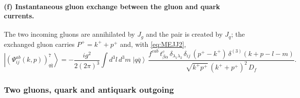 \documentclass[11pt,a4paper]{article}
\numberwithin{equation}{section}
\newcommand{\ibar}[2]{\draw[line width=1.1pt] (#1-0.13,#2) -- (#1+0.13,#2);}
\newcommand{\dthree}{\delta^{(3)}}
\newcommand{\ket}[1]{\left|#1\right\rangle}
\newcommand{\qk}[3]{q^{#1}_{#2}(#3)}
\newcommand{\aqk}[3]{\bar q^{#1}_{#2}(#3)}
\newcommand{\gl}[3]{g^{#1}_{#2}(#3)}
\begin{document}
\paragraph{(f) Instantaneous gluon exchange between the gluon and quark currents.}
\begin{center}
\end{center}
The two incoming gluons are annihilated by $J_{g}$ and the pair is created by $J_{q}$; the
exchanged gluon carries $P^{+}=k^{+}+p^{+}$ and, with \eqref{eq:MEJJ2},
\begin{equation}
\ket{(\Psi^{ab}_{ij}(k,p))^{7}_{q\bar q}}=-\frac{ig^{2}}{2(2\pi)^{3}}\int\!d^{3}l\,d^{3}m\;\ket{q\bar q}\,
\frac{f^{cab}\,t^{c}_{\beta\alpha}\,\delta_{\lambda_{1}\lambda_{2}}\,\delta_{ij}\,(p^{+}-k^{+})\,
\dthree(k+p-l-m)}{\sqrt{k^{+}p^{+}}\,(k^{+}+p^{+})^{2}\,D_{f}} .
\label{eq:B1f}
\end{equation}

\subsubsection{Two gluons, quark and antiquark outgoing}
\end{document}
